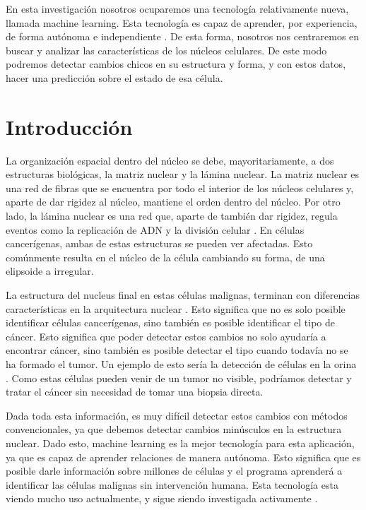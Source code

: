\documentclass[12pt, letterpaper]{article}
\begin{document}
En esta investigación nosotros ocuparemos una tecnología relativamente nueva, llamada machine learning. Esta tecnología es capaz de aprender, por experiencia, de forma autónoma e independiente \autocite{MachineLearningCambridge}. De esta forma, nosotros nos centraremos en buscar y analizar las características de los núcleos celulares. De este modo podremos detectar cambios chicos en su estructura y forma, y con estos datos, hacer una predicción sobre el estado de esa célula.

\newpage

\section{Introducción}

La organización espacial dentro del núcleo se debe, mayoritariamente, a dos estructuras biológicas, la matriz nuclear y la lámina nuclear. La matriz nuclear es una red de fibras que se encuentra por todo el interior de los núcleos celulares y, aparte de dar rigidez al núcleo, mantiene el orden dentro del núcleo. Por otro lado, la lámina nuclear es una red que, aparte de también dar rigidez, regula eventos como la replicación de ADN y la división celular \autocite[p.~200]{albertsBiologiaMolecularCelula2010, zinkNuclearStructureCancer2004}. En células cancerígenas, ambas de estas estructuras se pueden ver afectadas. Esto comúnmente resulta en el núcleo de la célula cambiando su forma, de una elipsoide a irregular.

La estructura del nucleus final en estas células malignas, terminan con diferencias características en la arquitectura nuclear \autocite{rynearsonNuclearStructureOrganization2011}. Esto significa que no es solo posible identificar células cancerígenas, sino también es posible identificar el tipo de cáncer. Esto significa que poder detectar estos cambios no solo ayudaría a encontrar cáncer, sino también es posible detectar el tipo cuando todavía no se ha formado el tumor. Un ejemplo de esto sería la detección de células en la orina \autocite{UrineCytologyMayo}. Como estas células pueden venir de un tumor no visible, podríamos detectar y tratar el cáncer sin necesidad de tomar una biopsia directa.

Dada toda esta información, es muy difícil detectar estos cambios con métodos convencionales, ya que debemos detectar cambios minúsculos en la estructura nuclear. Dado esto, machine learning es la mejor tecnología para esta aplicación, ya que es capaz de aprender relaciones de manera autónoma. Esto significa que es posible darle información sobre millones de células y el programa aprenderá a identificar las células malignas sin intervención humana. Esta tecnología esta viendo mucho uso actualmente, y sigue siendo investigada activamente \autocite{kourouMachineLearningApplications2015, carletonAdvancesComputationalMolecular2018}.
\end{document}
